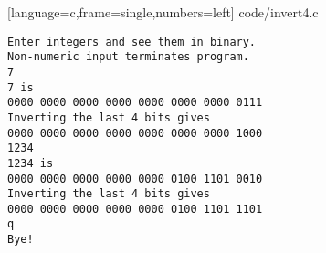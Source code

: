 \begin{frame}
  
  [language=c,frame=single,numbers=left]
  {code/invert4.c}
\end{frame}

\begin{frame}[fragile]
  \begin{lstlisting}[backgroundcolor=\color{red!20}]
Enter integers and see them in binary.
Non-numeric input terminates program.
7
7 is
0000 0000 0000 0000 0000 0000 0000 0111
Inverting the last 4 bits gives
0000 0000 0000 0000 0000 0000 0000 1000
1234
1234 is
0000 0000 0000 0000 0000 0100 1101 0010
Inverting the last 4 bits gives
0000 0000 0000 0000 0000 0100 1101 1101
q
Bye!
  \end{lstlisting}
\end{frame}